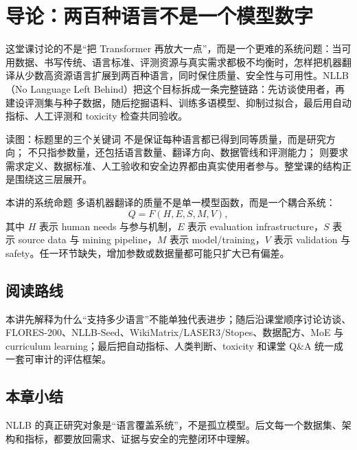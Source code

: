 \section{导论：两百种语言不是一个模型数字}

这堂课讨论的不是“把 Transformer 再放大一点”，而是一个更难的系统问题：当可用数据、书写传统、语言标准、评测资源与真实需求都极不均衡时，怎样把机器翻译从少数高资源语言扩展到两百种语言，同时保住质量、安全性与可用性。NLLB（No Language Left Behind）把这个目标拆成一条完整链路：先访谈使用者，再建设评测集与种子数据，随后挖掘语料、训练多语模型、抑制过拟合，最后用自动指标、人工评测和 toxicity 检查共同验收。


\begin{knowledgebox}{读图：标题里的三个关键词}
 不是保证每种语言都已得到同等质量，而是研究方向； 不只指参数量，还包括语言数量、翻译方向、数据管线和评测能力； 则要求需求定义、数据标准、人工验收和安全边界都由真实使用者参与。整堂课的结构正是围绕这三层展开。
\end{knowledgebox}


\begin{importantbox}{本讲的系统命题}
多语机器翻译的质量不是单一模型函数，而是一个耦合系统：
\[
Q = F(H,E,S,M,V),
\]
其中 $H$ 表示 human needs 与参与机制，$E$ 表示 evaluation infrastructure，$S$ 表示 source data 与 mining pipeline，$M$ 表示 model/training，$V$ 表示 validation 与 safety。任一环节缺失，增加参数或数据量都可能只扩大已有偏差。
\end{importantbox}

\subsection{阅读路线}

本讲先解释为什么“支持多少语言”不能单独代表进步；随后沿课堂顺序讨论访谈、FLORES-200、NLLB-Seed、WikiMatrix/LASER3/Stopes、数据配方、MoE 与 curriculum learning；最后把自动指标、人类判断、toxicity 和课堂 Q\&A 统一成一套可审计的评估框架。

\subsection{本章小结}

NLLB 的真正研究对象是“语言覆盖系统”，不是孤立模型。后文每一个数据集、架构和指标，都要放回需求、证据与安全的完整闭环中理解。

